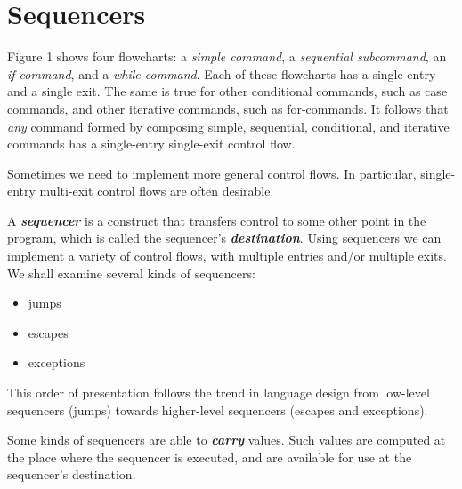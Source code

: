 \section{Sequencers}
\label{sec:sequencers}

Figure 1 shows four flowcharts: a \textit{simple command}, a \textit{sequential subcommand}, an \textit{if-command}, and a \textit{while-command}. Each of these flowcharts has a single entry and a single exit. The same is true for other conditional commands, such as case commands, and other iterative commands, such as for-commands. It follows that \textit{any} command formed by composing simple, sequential, conditional, and iterative commands has a single-entry single-exit control flow.

Sometimes we need to implement more general control flows. In particular, single-entry multi-exit control flows are often desirable.

A \textit{\textbf{sequencer}} is a construct that transfers control to some other point in the program, which is called the sequencer's \textit{\textbf{destination}}. Using sequencers we can implement a variety of control flows, with multiple entries and/or multiple exits. We shall examine several kinds of sequencers:
\setlength{\columnsep}{0cm}
\setlength{\columnseprule}{0pt}
\begin{multicols}{3}
  \begin{itemize}[leftmargin=4pt]
    \item jumps
    \item escapes
    \item exceptions 
  \end{itemize}
\end{multicols}
\setlength{\columnsep}{1.5cm}
\setlength{\columnseprule}{0.2pt}
This order of presentation follows the trend in language design from low-level sequencers (jumps) towards higher-level sequencers (escapes and exceptions).

Some kinds of sequencers are able to \textit{\textbf{carry}} values. Such values are computed at the place where the sequencer is executed, and are available for use at the sequencer's destination.
